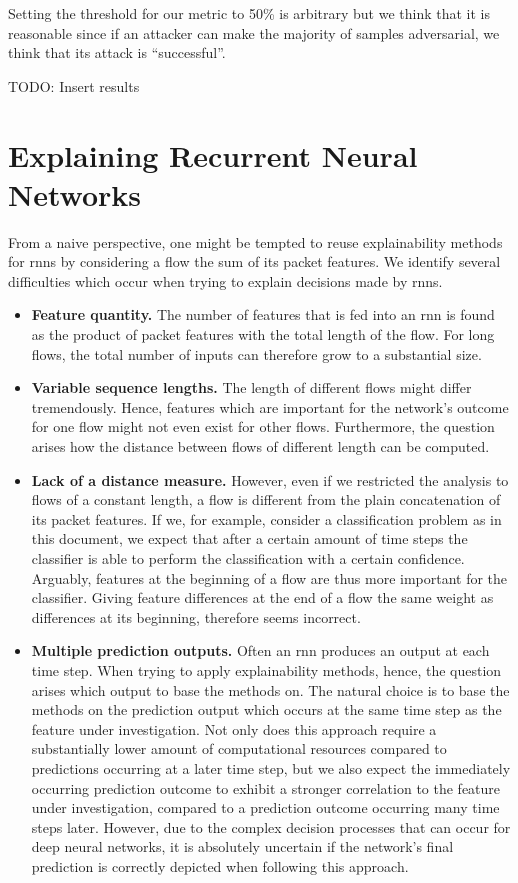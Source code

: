 \documentclass[conference]{IEEEtran}
\newcommand\note[2]{{\color{#1}#2}}
\newcommand\todo[1]{{\note{red}{TODO: #1}}}
\begin{document}
Setting the threshold for our metric to 50\% is arbitrary but we think that it is reasonable since if an attacker can make the majority of samples adversarial, we think that its attack is ``successful''.

\todo{Insert results}

\section{Explaining Recurrent Neural Networks}
From a naive perspective, one might be tempted to reuse explainability methods for \glspl{rnn} by considering a flow the sum of its packet features.
We identify several difficulties which occur when trying to explain decisions made by \glspl{rnn}. 

\begin{itemize}[topsep=0pt,wide,labelwidth=!,labelindent=0pt]
\item
\textbf{Feature quantity.}
The number of features that is fed into an \gls{rnn} is found as the product of packet features with the total length of the flow. For long flows, the total number of inputs can therefore grow to a substantial size.

\item
\textbf{Variable sequence lengths.}
The length of different flows might differ tremendously. Hence, features which are important for the network's outcome for one flow might not even exist for other flows. Furthermore, the question arises how the distance between flows of different length can be computed.

\item
\textbf{Lack of a distance measure.}
However, even if we restricted the analysis to flows of a constant length, a flow is different from the plain concatenation of its packet features.
If we, for example, consider a classification problem as in this document, we expect that after a certain amount of time steps the classifier is able to perform the classification with a certain confidence. Arguably, features at the beginning of a flow are thus more important for the classifier. Giving feature differences at the end of a flow the same weight as differences at its beginning, therefore seems incorrect.

\item
\textbf{Multiple prediction outputs.}
Often an \gls{rnn} produces an output at each time step. When trying to apply explainability methods, hence, the question arises which output to base the methods on. The natural choice is to base the methods on the prediction output which occurs at the same time step as the feature under investigation. Not only does this approach require a substantially lower amount of computational resources compared to predictions occurring at a later time step, but we also expect the immediately occurring prediction outcome to exhibit a stronger correlation to the feature under investigation, compared to a prediction outcome occurring many time steps later.
However, due to the complex decision processes that can occur for deep neural networks, it is absolutely  uncertain if the network's final prediction is correctly depicted when following this approach.
\end{itemize}
\end{document}
